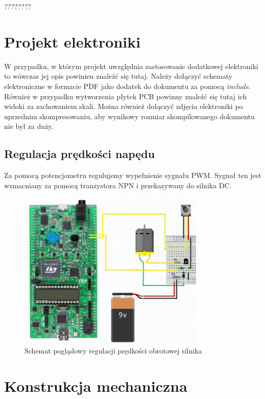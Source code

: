 \documentclass[10pt, a4paper]{article}
\begin{document}
????????

\section{Projekt elektroniki}

W przypadku, w którym projekt uwzględnia zastosowanie 
dodatkowej elektroniki to wówczas jej opis powinien znaleźć się tutaj.
Należy dołączyć schematy elektroniczne w formacie PDF 
jako dodatek do dokumentu 
za pomocą \textit{include}. Również w przypadku wytworzenia 
płytek PCB powinny znaleźć się tutaj ich widoki za zachowaniem skali.
Można również dołączyć zdjęcia 
elektroniki po uprzednim skompresowaniu, aby wynikowy rozmiar 
skompilowanego dokumentu nie był za duży.
\subsection{Regulacja prędkości napędu}
Za pomocą potencjometru regulujemy wypełnienie sygnału PWM. Sygnał ten jest wzmacniany za pomocą tranzystora NPN i przekazywany do silnika DC.

\begin{figure}[H]
	\centering
	\includegraphics[width=0.8\textwidth]{figures/PWM.png}
	\caption{Schemat poglądowy regulacji prędkości obrotowej silnika}
	\label{fig:KonfiguracjaPWM}
\end{figure}

\section{Konstrukcja mechaniczna}
\end{document}
